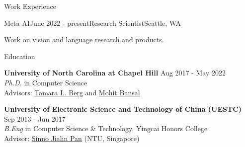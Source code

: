 \documentclass{resume} %
\begin{document}

\begin{rSection}{Work Experience}


    \begin{rSubsection}{Meta AI}{June 2022 - present}{Research Scientist}{Seattle, WA}
        \item Work on vision and language research and products.
    \end{rSubsection}    

    \end{rSection}


\begin{rSection}{Education}

{\bf University of North Carolina at Chapel Hill} \hfill {Aug 2017  -  May 2022} \\ 
{\sl Ph.D.} in Computer Science \\
Advisors: \href{http://www.tamaraberg.com/}{Tamara L. Berg} and \href{http://www.cs.unc.edu/~mbansal/}{Mohit Bansal}

{\bf University of Electronic Science and Technology of China (UESTC)} \hfill {Sep 2013 - Jun 2017} \\ 
{\sl B.Eng} in Computer Science \& Technology, Yingcai Honors College\\
Advisor: \href{https://personal.ntu.edu.sg/sinnopan/}{Sinno Jialin Pan} (NTU, Singapore)
\end{rSection}

\end{document}

